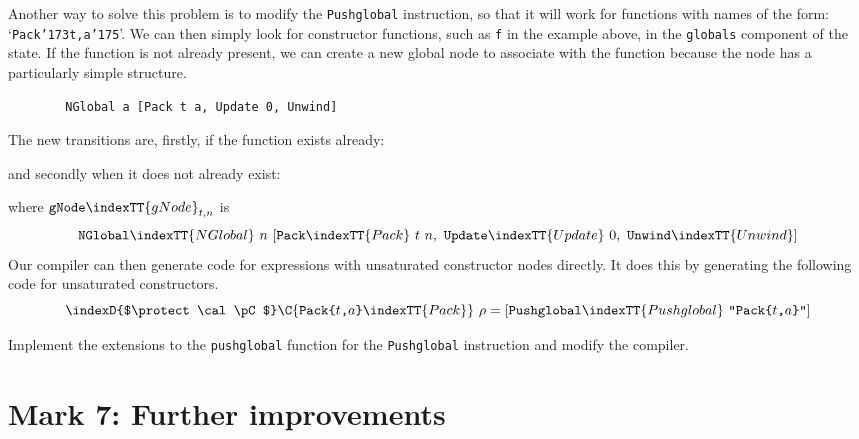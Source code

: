Another way to solve this problem is to modify the \mbox{\tt Pushglobal}
instruction, so that it will work for functions with names of the
form: `\mbox{\tt Pack{\char'173}t,a{\char'175}}'. We can then simply look for constructor functions,
such as \mbox{\tt f} in the example above, in the \mbox{\tt globals} component of the
state.  If the function is not already present, we can create a new
global node to associate with the function because the node has a
particularly simple structure.
\begin{verbatim}
        NGlobal a [Pack t a, Update 0, Unwind]
\end{verbatim}
The new transitions are, firstly, if the function exists already:

\gmruleod%
{}%
{}
%
and secondly when it does not already exist:

\gmruleod%
{}%
{}
where $\mbox{\tt gNode}\indexTT{gNode}_{t,n}$ is
\[
\mbox{\tt NGlobal}\indexTT{NGlobal}\ n\ [\mbox{\tt Pack}\indexTT{Pack}\ t\ n,\ \mbox{\tt Update}\indexTT{Update}\ 0,\ \mbox{\tt Unwind}\indexTT{Unwind}]
\]
Our compiler can then generate code for expressions with unsaturated
constructor nodes directly. It does this by generating the following
code for unsaturated constructors.
\[
\indexD{$\protect\cal \pC$}\C{\mbox{\tt Pack{\char'173}} t \mbox{\tt ,} a \mbox{\tt {\char'175}}\indexTT{Pack} }~\rho = [\mbox{\tt Pushglobal}\indexTT{Pushglobal}\ \mbox{\tt "Pack{\char'173}} t \mbox{\tt ,} a \mbox{\tt {\char'175}"}]
\]

\begin{exercise}\label{gm:X:6consext}
Implement the extensions to the \mbox{\tt pushglobal} function for the
\mbox{\tt Pushglobal} instruction and modify the compiler.
\end{exercise}

\section{Mark 7: Further
improvements}
\label{sect:v-stack}

